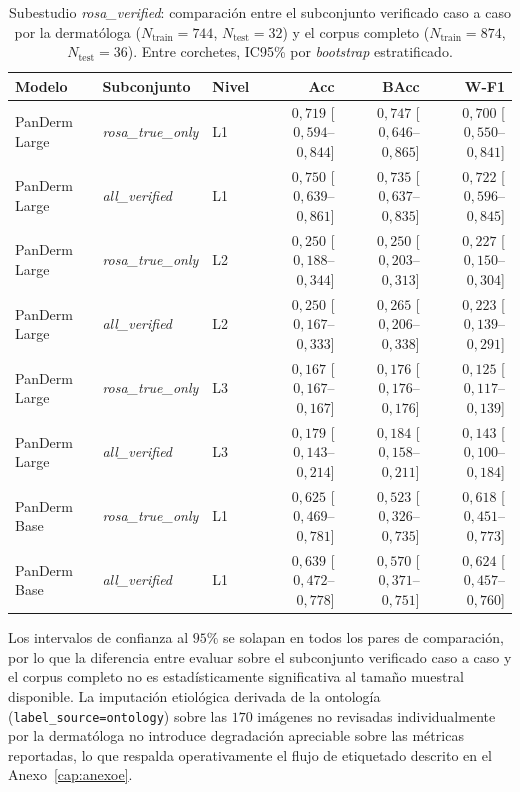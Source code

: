 \begin{table}[H]
\centering
\footnotesize
\setlength{\tabcolsep}{4pt}
\renewcommand{\arraystretch}{0.95}
\caption{Subestudio \emph{rosa\_verified}: comparación entre el
subconjunto verificado caso a caso por la dermatóloga
($N_{\mathrm{train}} = 744$, $N_{\mathrm{test}} = 32$) y el corpus
completo ($N_{\mathrm{train}} = 874$, $N_{\mathrm{test}} = 36$).
Entre corchetes, IC95\% por \emph{bootstrap} estratificado.}
\label{tab:dermapixel-rosa}
\begin{tabular}{lllrrr}
\hline
Modelo & Subconjunto & Nivel & Acc & BAcc & W-F1 \\
\hline
PanDerm Large & \emph{rosa\_true\_only} & L1
  & $0{,}719$ [$0{,}594$--$0{,}844$]
  & $0{,}747$ [$0{,}646$--$0{,}865$]
  & $0{,}700$ [$0{,}550$--$0{,}841$] \\
PanDerm Large & \emph{all\_verified}    & L1
  & $0{,}750$ [$0{,}639$--$0{,}861$]
  & $0{,}735$ [$0{,}637$--$0{,}835$]
  & $0{,}722$ [$0{,}596$--$0{,}845$] \\
PanDerm Large & \emph{rosa\_true\_only} & L2
  & $0{,}250$ [$0{,}188$--$0{,}344$]
  & $0{,}250$ [$0{,}203$--$0{,}313$]
  & $0{,}227$ [$0{,}150$--$0{,}304$] \\
PanDerm Large & \emph{all\_verified}    & L2
  & $0{,}250$ [$0{,}167$--$0{,}333$]
  & $0{,}265$ [$0{,}206$--$0{,}338$]
  & $0{,}223$ [$0{,}139$--$0{,}291$] \\
PanDerm Large & \emph{rosa\_true\_only} & L3
  & $0{,}167$ [$0{,}167$--$0{,}167$]
  & $0{,}176$ [$0{,}176$--$0{,}176$]
  & $0{,}125$ [$0{,}117$--$0{,}139$] \\
PanDerm Large & \emph{all\_verified}    & L3
  & $0{,}179$ [$0{,}143$--$0{,}214$]
  & $0{,}184$ [$0{,}158$--$0{,}211$]
  & $0{,}143$ [$0{,}100$--$0{,}184$] \\
PanDerm Base  & \emph{rosa\_true\_only} & L1
  & $0{,}625$ [$0{,}469$--$0{,}781$]
  & $0{,}523$ [$0{,}326$--$0{,}735$]
  & $0{,}618$ [$0{,}451$--$0{,}773$] \\
PanDerm Base  & \emph{all\_verified}    & L1
  & $0{,}639$ [$0{,}472$--$0{,}778$]
  & $0{,}570$ [$0{,}371$--$0{,}751$]
  & $0{,}624$ [$0{,}457$--$0{,}760$] \\
\hline
\end{tabular}
\end{table}

Los intervalos de confianza al $95\%$ se solapan en todos los
pares de comparación, por lo que la diferencia entre evaluar sobre
el subconjunto verificado caso a caso y el corpus completo no es
estadísticamente significativa al tamaño muestral disponible. La
imputación etiológica derivada de la ontología
(\texttt{label\_source=ontology}) sobre las $170$ imágenes no
revisadas individualmente por la dermatóloga no introduce
degradación apreciable sobre las métricas reportadas, lo que
respalda operativamente el flujo de etiquetado descrito en el
Anexo~\ref{cap:anexoe}.

